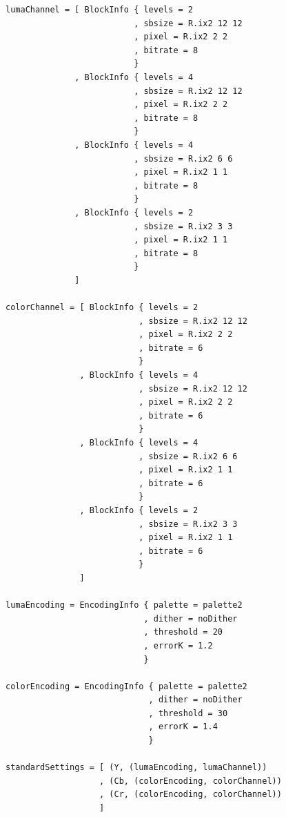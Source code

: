 \documentclass[a4paper,12pt]{article}
\numberwithin{equation}{section}
\begin{document}
\begin{lstlisting}[float=p,caption={Пример конфигурации},label=lst:conf]
lumaChannel = [ BlockInfo { levels = 2
                          , sbsize = R.ix2 12 12
                          , pixel = R.ix2 2 2
                          , bitrate = 8
                          }
              , BlockInfo { levels = 4
                          , sbsize = R.ix2 12 12
                          , pixel = R.ix2 2 2
                          , bitrate = 8
                          }
              , BlockInfo { levels = 4
                          , sbsize = R.ix2 6 6
                          , pixel = R.ix2 1 1
                          , bitrate = 8
                          }
              , BlockInfo { levels = 2
                          , sbsize = R.ix2 3 3
                          , pixel = R.ix2 1 1
                          , bitrate = 8
                          }
              ]

colorChannel = [ BlockInfo { levels = 2
                           , sbsize = R.ix2 12 12
                           , pixel = R.ix2 2 2
                           , bitrate = 6
                           }
               , BlockInfo { levels = 4
                           , sbsize = R.ix2 12 12
                           , pixel = R.ix2 2 2
                           , bitrate = 6
                           }
               , BlockInfo { levels = 4
                           , sbsize = R.ix2 6 6
                           , pixel = R.ix2 1 1
                           , bitrate = 6
                           }
               , BlockInfo { levels = 2
                           , sbsize = R.ix2 3 3
                           , pixel = R.ix2 1 1
                           , bitrate = 6
                           }
               ]
               
lumaEncoding = EncodingInfo { palette = palette2
                            , dither = noDither
                            , threshold = 20
                            , errorK = 1.2
                            }
               
colorEncoding = EncodingInfo { palette = palette2
                             , dither = noDither
                             , threshold = 30
                             , errorK = 1.4
                             }

standardSettings = [ (Y, (lumaEncoding, lumaChannel))
                   , (Cb, (colorEncoding, colorChannel))
                   , (Cr, (colorEncoding, colorChannel))
                   ]
\end{lstlisting}
\end{document}
